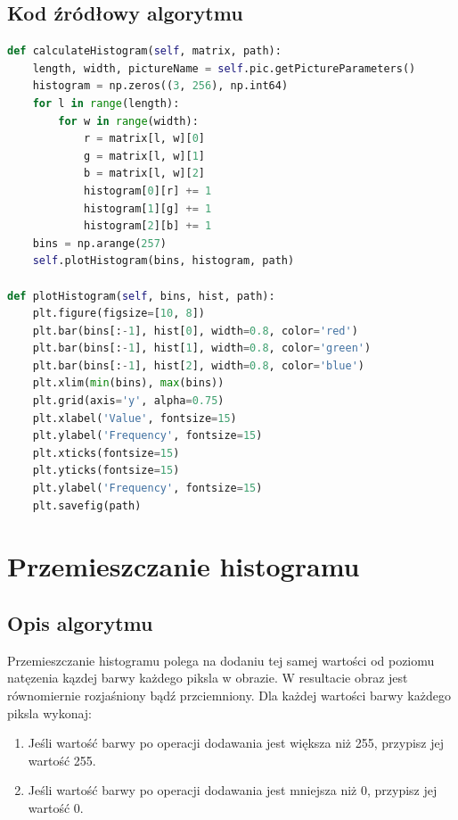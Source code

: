 \documentclass[a4paper,12pt, titlepage]{report}
\begin{document}
\subsection*{Kod źródłowy algorytmu}
\begin{lstlisting}[language=Python]
def calculateHistogram(self, matrix, path):
    length, width, pictureName = self.pic.getPictureParameters()
    histogram = np.zeros((3, 256), np.int64)
    for l in range(length):
        for w in range(width):
            r = matrix[l, w][0]
            g = matrix[l, w][1]
            b = matrix[l, w][2]
            histogram[0][r] += 1
            histogram[1][g] += 1
            histogram[2][b] += 1
    bins = np.arange(257)
    self.plotHistogram(bins, histogram, path)
    
def plotHistogram(self, bins, hist, path):
    plt.figure(figsize=[10, 8])
    plt.bar(bins[:-1], hist[0], width=0.8, color='red')
    plt.bar(bins[:-1], hist[1], width=0.8, color='green')
    plt.bar(bins[:-1], hist[2], width=0.8, color='blue')
    plt.xlim(min(bins), max(bins))
    plt.grid(axis='y', alpha=0.75)
    plt.xlabel('Value', fontsize=15)
    plt.ylabel('Frequency', fontsize=15)
    plt.xticks(fontsize=15)
    plt.yticks(fontsize=15)
    plt.ylabel('Frequency', fontsize=15)
    plt.savefig(path)
\end{lstlisting}

\section{Przemieszczanie histogramu}
\subsection*{Opis algorytmu}
\par Przemieszczanie histogramu polega na dodaniu tej samej wartości od poziomu natęzenia kązdej barwy każdego piksla w obrazie. W resultacie obraz jest równomiernie rozjaśniony bądź przciemniony. Dla każdej wartości barwy każdego piksla wykonaj:
\begin{enumerate}
\item Jeśli wartość barwy po operacji dodawania jest większa niż 255, przypisz jej wartość 255.
\item Jeśli wartość barwy po operacji dodawania jest mniejsza niż 0, przypisz jej wartość 0.
\end{enumerate}
\end{document}
